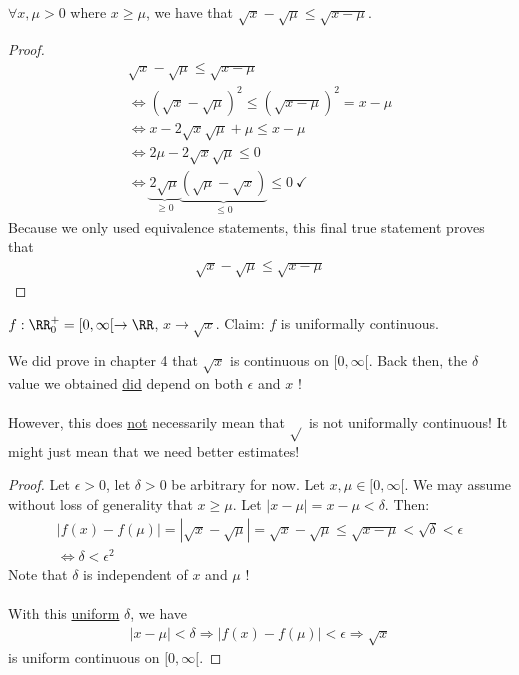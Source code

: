 \documentclass[class=scrartcl, crop=false]{standalone}
\begin{document}
\begin{lemma}
  $\forall x, \mu > 0$ where $x \geq \mu$, we have that $\sqrt{x} - \sqrt{\mu} \leq \sqrt{x - \mu}$.
  \begin{proof}
    \begin{gather*}
      \sqrt{x} - \sqrt{\mu} \leq \sqrt{x - \mu} \\
      \Leftrightarrow (\sqrt{x} - \sqrt{\mu})^2 \leq (\sqrt{x - \mu})^2 = x - \mu \\
      \Leftrightarrow x - 2 \sqrt{x}\sqrt{\mu} + \mu \leq x - \mu \\
      \Leftrightarrow 2\mu - 2\sqrt{x}\sqrt{\mu} \leq 0 \\
      \Leftrightarrow \underbrace{2\sqrt{\mu}}_{\geq 0}\underbrace{(\sqrt{\mu} - \sqrt{x})}_{\leq 0} \leq 0 \ \checkmark
    \end{gather*} 
    Because we only used equivalence statements, this final true statement proves that 
    \begin{gather*}
      \sqrt{x} - \sqrt{\mu} \leq \sqrt{x - \mu}
    \end{gather*}
  \end{proof} 
\end{lemma} 

\begin{example}
  $f : \RR_0^+ = [0, \infty[ \to \RR$, $x \to \sqrt{x}$. Claim: $f$ is uniformally continuous.
  \begin{remark}
    We did prove in chapter 4 that $\sqrt{x}$ is continuous on $[0, \infty[$. Back then, the $\delta$ value we obtained \ul{did} depend on both $\epsilon$ and $x$ !
    \\\\
    However, this does \ul{not} necessarily mean that $\sqrt{}$ is not uniformally continuous! It might just mean that we need better estimates!
  \end{remark}
  \begin{proof}
    Let $\epsilon > 0$, let $\delta > 0$ be arbitrary for now. Let $x, \mu \in [0, \infty[$. We may assume without loss of generality that $x \geq \mu$. Let $|x - \mu| = x - \mu < \delta$. Then:
    \begin{gather*}
      |f(x) - f(\mu)| = |\sqrt{x} - \sqrt{\mu}| = \sqrt{x} - \sqrt{\mu} \leq \sqrt{x - \mu} < \sqrt{\delta} < \epsilon \\
      \Leftrightarrow \delta < \epsilon^2
    \end{gather*} 
    Note that $\delta$ is independent of $x$ and $\mu$ !
    \\\\
    With this \ul{uniform} $\delta$, we have
    \begin{gather*}
      |x - \mu| < \delta \Rightarrow|f(x) - f(\mu)| < \epsilon \Rightarrow \sqrt{x}
    \end{gather*} is uniform continuous on $[0, \infty[$.
  \end{proof} 
\end{example} 
\end{document}
